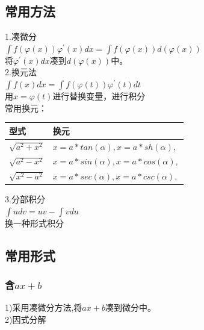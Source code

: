 \documentclass[fleqn]{article}
\begin{document}
\begin{flushleft}
	\subsection{常用方法}
		1.凑微分\\
		$\int f(\varphi(x))\varphi^{'}(x)dx=\int f(\varphi(x))d(\varphi(x))$\\
		将$\varphi^{'}(x)dx$凑到$d(\varphi(x))$中。\\
		2.换元法\\
		$\int f(x)dx=\int f(\varphi(t))\varphi^{'}(t)dt$\\
		用$x=\varphi(t)$进行替换变量，进行积分\\
		常用换元：\\
		\begin{tabular}{|l|l|}
\hline
			型式 & 换元\\
\hline
			$\sqrt{a^2+x^2}$ & $x=a*tan(\alpha),x=a*sh(\alpha),$\\
			$\sqrt{a^2-x^2}$ & $x=a*sin(\alpha),x=a*cos(\alpha),$\\
			$\sqrt{x^2-a^2}$ & $x=a*sec(\alpha),x=a*csc(\alpha)$,\\
\hline
		\end{tabular}

		3.分部积分\\
		$\int udv=uv-\int vdu$\\
		换一种形式积分
	\subsection{常用形式}
		\subsubsection{含$ax+b$}
		1)采用凑微分方法,将$ax+b$凑到微分中。\\
		2)因式分解\\

\end{flushleft}
\end{document}
